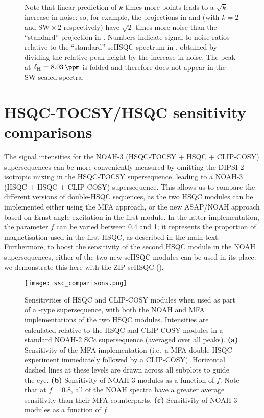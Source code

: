 \begin{figure}
{        Note that linear prediction of $k$ times more points leads to a $\sqrt{k}$ increase in noise: so, for example, the projections in  and  (with $k = 2$ and $\mathrm{SW \times 2}$ respectively) have $\sqrt{2}$ times more noise than the ``standard'' projection in .
        Numbers indicate signal-to-noise ratios relative to the ``standard'' seHSQC spectrum in , obtained by dividing the relative peak height by the increase in noise.
        The peak at $\delta_{\ce{H}} = \SI{8.03}{\ppm}$ is folded and therefore does not appear in the SW-scaled spectra.
        \grami{}
    }
    \label{fig:spv2_kscale_lp}
\end{figure}

\section{HSQC-TOCSY/HSQC sensitivity comparisons}

The signal intensities for the NOAH-3  (HSQC-TOCSY + HSQC + CLIP-COSY) supersequences can be more conveniently measured by omitting the DIPSI-2 isotropic mixing in the HSQC-TOCSY supersequence, leading to a NOAH-3  (HSQC + HSQC + CLIP-COSY) supersequence.
This allows us to compare the different versions of double-HSQC sequences, as the two HSQC modules can be implemented either using the MFA approach, or the new ASAP/NOAH approach based on Ernst angle excitation in the first module.
In the latter implementation, the parameter $f$ can be varied between 0.4 and 1; it represents the proportion of  magnetisation used in the first HSQC, as described in the main text.
Furthermore, to boost the sensitivity of the second HSQC module in the NOAH supersequences, either of the two new seHSQC modules can be used in its place: we demonstrate this here with the ZIP-seHSQC (\noahSpb{}).

\begin{figure}
    \centering
    \texttt{[image: ssc\_comparisons.png]}
    \caption{
        Sensitivities of HSQC and CLIP-COSY modules when used as part of a -type supersequence, with both the NOAH and MFA implementations of the two HSQC modules.
        Intensities are calculated relative to the HSQC and CLIP-COSY modules in a standard NOAH-2 SCc supersequence (averaged over all peaks).
        \textbf{(a)} Sensitivity of the MFA implementation (i.e.\ a MFA double HSQC experiment immediately followed by a CLIP-COSY).
        Horizontal dashed lines at these levels are drawn across all subplots to guide the eye.
        \textbf{(b)} Sensitivity of NOAH-3  modules as a function of $f$.
        Note that at $f = 0.8$, all of the NOAH spectra have a greater average sensitivity than their MFA counterparts.
        \textbf{(c)} Sensitivity of NOAH-3  modules as a function of $f$.
        \andro{}
    }
    \label{fig:ssc_comparisons}
\end{figure}

